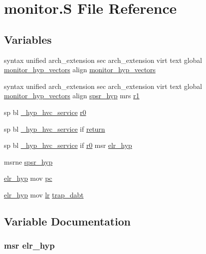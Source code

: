 \hypertarget{monitor_8_s}{\section{monitor.\-S \-File \-Reference}
\label{monitor_8_s}
}
\subsection*{\-Variables}
\begin{DoxyCompactItemize}
\item 
syntax unified arch\-\_\-extension \*
sec arch\-\_\-extension virt text \*
global \hyperlink{monitor_8_s_a4ef4efb0188af1c1fb8dddad7636fc8a}{monitor\-\_\-hyp\-\_\-vectors} \*
align \hyperlink{monitor_8_s_a4ef4efb0188af1c1fb8dddad7636fc8a}{monitor\-\_\-hyp\-\_\-vectors}
\item 
syntax unified arch\-\_\-extension \*
sec arch\-\_\-extension virt text \*
global \hyperlink{monitor_8_s_a4ef4efb0188af1c1fb8dddad7636fc8a}{monitor\-\_\-hyp\-\_\-vectors} \*
align \hyperlink{monitor_8_s_a12f8aefcae70cf8def5efce7fa6e8ecf}{spsr\-\_\-hyp} mrs \hyperlink{monitor_8_s_aef776bba48a0f8bc4defd2244e15bf63}{r1}
\item 
sp bl \hyperlink{trap_8c_a42d256f30a2bf8ef90ed868c166df734}{\-\_\-hyp\-\_\-hvc\-\_\-service} \hyperlink{monitor_8_s_ad1c67bb474f6fe7f892f43e3b42fcbcd}{r0}
\item 
sp bl \hyperlink{trap_8c_a42d256f30a2bf8ef90ed868c166df734}{\-\_\-hyp\-\_\-hvc\-\_\-service} if \hyperlink{monitor_8_s_afb820df2c9dbd34b23c1372ce18de4a8}{return}
\item 
sp bl \hyperlink{trap_8c_a42d256f30a2bf8ef90ed868c166df734}{\-\_\-hyp\-\_\-hvc\-\_\-service} if \hyperlink{monitor__secure_8_s_a52d1ac37c436f49666d8e195af78d552}{r0} msr \hyperlink{monitor_8_s_ad6a37adf2074ccea5c6cd85fe6676b30}{elr\-\_\-hyp}
\item 
msrne \hyperlink{monitor_8_s_a12f8aefcae70cf8def5efce7fa6e8ecf}{spsr\-\_\-hyp}
\item 
\hyperlink{monitor_8_s_ad6a37adf2074ccea5c6cd85fe6676b30}{elr\-\_\-hyp} mov \hyperlink{monitor_8_s_a9c0336e2400aaea86bf8157c919459bc}{pc}
\item 
\hyperlink{monitor_8_s_ad6a37adf2074ccea5c6cd85fe6676b30}{elr\-\_\-hyp} mov \hyperlink{context_8h_a6ced3f4007bb60daf12191c058e55b8c}{lr} \hyperlink{monitor_8_s_a81814ef2d4e0eec675fbcdd2fc5d771b}{trap\-\_\-dabt}
\end{DoxyCompactItemize}


\subsection{\-Variable \-Documentation}
\hypertarget{monitor_8_s_ad6a37adf2074ccea5c6cd85fe6676b30}{
\subsubsection[{elr\-\_\-hyp}]{ msr {\bf elr\-\_\-hyp}}}\label{monitor_8_s_ad6a37adf2074ccea5c6cd85fe6676b30}



